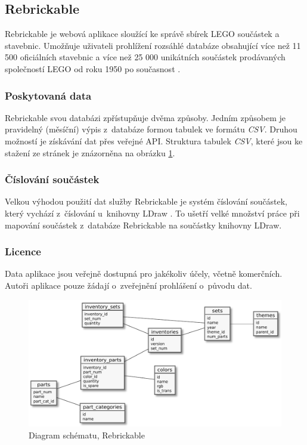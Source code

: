 \subsection{Rebrickable}\label{reserse-rebrickable}
  Rebrickable \autocite{rebrickable:homepage} je webová aplikace sloužící ke správě sbírek LEGO součástek a stavebnic. Umožňuje uživateli prohlížení rozsáhlé databáze obsahující více než 11 500 oficiálních stavebnic a více než 25 000 unikátních součástek prodávaných společností LEGO od roku 1950 po současnost \autocite{rebrickable:about}. 

  \subsubsection*{Poskytovaná data}  
  Rebrickable svou databázi zpřístupňuje dvěma způsoby. Jedním způsobem je pravidelný (měsíční) výpis z~databáze formou tabulek ve formátu \textit{\gls{CSV}}. Druhou možností je získávání dat přes veřejné \gls{API}. Struktura tabulek \textit{\gls{CSV}}, které jsou ke stažení ze stránek \autocite{rebrickable:download} je znázorněna na obrázku \ref{diagram-rebrickable}.

  \subsubsection*{Číslování součástek}
  Velkou výhodou použití dat služby Rebrickable je systém číslování součástek, který vychází z~číslování u~knihovny LDraw \autocite{rebrickable:faq}. To ušetří velké množství práce při mapování součástek z~databáze Rebrickable na součástky knihovny LDraw. 
  
  \subsubsection*{Licence}
  Data aplikace jsou veřejně dostupná pro jakékoliv účely, včetně komerčních. Autoři aplikace pouze žádají o~zveřejnění prohlášení o~původu dat. \autocite{rebrickable:terms}
  
  \begin{figure}[htbp]
    \centering
    \includegraphics[width=\textwidth,height=\textheight,keepaspectratio]{pdfs/rebrickable_schema}
    \caption{Diagram schématu, Rebrickable \autocite{rebrickable:download}\label{diagram-rebrickable}}
  \end{figure}

